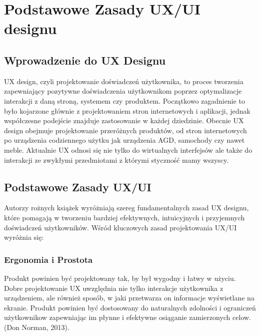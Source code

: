 \chapter{Podstawowe Zasady UX/UI designu}


\section{Wprowadzenie do UX Designu}

 UX design, czyli projektowanie doświadczeń użytkownika, to proces tworzenia zapewniający pozytywne doświadczenia użytkownikom poprzez optymalizacje interakcji z daną stroną, systemem czy produktem. Początkowo zagadnienie to było kojarzone głównie z projektowaniem stron internetowych i aplikacji, jednak współczesne podejście znajduje zastosowanie w każdej dziedzinie. Obecnie UX design obejmuje projektowanie przeróżnych produktów, od stron internetowych po urządzenia codziennego użytku jak urządzenia AGD, samochody czy nawet meble. Aktualnie UX odnosi się nie tylko do wirtualnych interfejsów ale także do interakcji ze zwykłymi przedmiotami z którymi styczność mamy wszyscy.


\section{Podstawowe Zasady UX/UI}

Autorzy rożnych książek wyróżniają szereg fundamentalnych zasad UX designu, które pomagają w tworzeniu bardziej efektywnych, intuicyjnych i przyjemnych doświadczeń użytkowników.
Wśród kluczowych zasad projektowania UX/UI wyróżnia się:


\subsection{Ergonomia i Prostota}
Produkt powinien być projektowany tak, by był wygodny i łatwy w użyciu. Dobre projektowanie UX uwzględnia nie tylko interakcje użytkownika z urządzeniem, ale również sposób, w jaki przetwarza on informacje wyświetlane na ekranie. Produkt powinien być dostosowany do naturalnych zdolności i ograniczeń użytkownikow zapewniając im płynne i efektywne osiąganie zamierzonych celow.(Don Norman, 2013).

